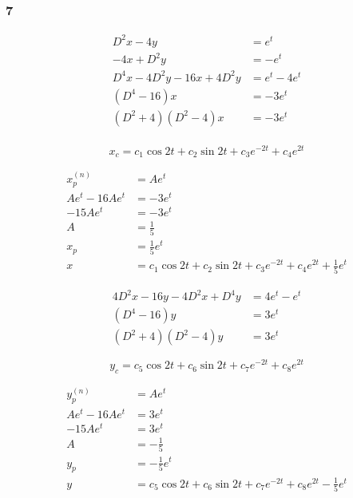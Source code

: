 \documentclass{article}
\begin{document}
\subsubsection{7}

\begin{align*}
  D^2 x - 4 y                      & = e^t         \\
  -4 x + D^2 y                     & = -e^t        \\
  D^4 x - 4 D^2 y - 16 x + 4 D^2 y & = e^t - 4 e^t \\
  (D^4 - 16) x                     & = -3 e^t      \\
  (D^2 + 4) (D^2 - 4) x            & = -3 e^t      \\
\end{align*}

\[x_c = c_1 \cos 2 t + c_2 \sin 2 t + c_3 e^{-2 t} + c_4 e^{2 t}\]

\begin{align*}
  x_p^{(n)}        & = A e^t                                                                      \\
  A e^t - 16 A e^t & = -3 e^t                                                                     \\
  -15 A e^t        & = -3 e^t                                                                     \\
  A                & = \frac{1}{5}                                                                \\
  x_p              & = \frac{1}{5} e^t                                                            \\
  x                & = c_1 \cos 2 t + c_2 \sin 2 t + c_3 e^{-2 t} + c_4 e^{2 t} + \frac{1}{5} e^t
\end{align*}

\begin{align*}
  4 D^2 x - 16 y - 4 D^2 x + D^4 y & = 4 e^t - e^t \\
  (D^4 - 16) y                     & = 3 e^t       \\
  (D^2 + 4) (D^2 - 4) y            & = 3 e^t
\end{align*}

\[y_c = c_5 \cos 2 t + c_6 \sin 2 t + c_7 e^{-2 t} + c_8 e^{2 t}\]

\begin{align*}
  y_p^{(n)}        & = A e^t                                                                      \\
  A e^t - 16 A e^t & = 3 e^t                                                                      \\
  -15 A e^t        & = 3 e^t                                                                      \\
  A                & = -\frac{1}{5}                                                               \\
  y_p              & = -\frac{1}{5} e^t                                                           \\
  y                & = c_5 \cos 2 t + c_6 \sin 2 t + c_7 e^{-2 t} + c_8 e^{2 t} - \frac{1}{5} e^t
\end{align*}
\end{document}
